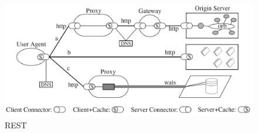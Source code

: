 \begin{figure}[h]
  \centering
  \includegraphics[width=\linewidth]{../Kapitel/Grafiken/REST-process-view.png}
  \caption{REST \cite[84]{REST}}
  \label{img:REST-diss}
\end{figure}

